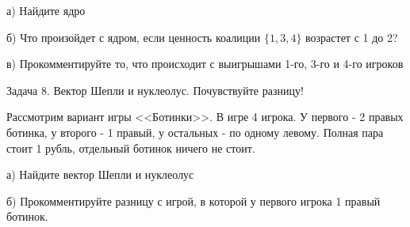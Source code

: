 а) Найдите ядро

б) Что произойдет с ядром, если ценность коалиции $\{1,3,4\}$ возрастет с 1 до 2?

в) Прокомментируйте то, что происходит с выигрышами 1-го, 3-го и 4-го игроков


Задача 8. Вектор Шепли и нуклеолус. Почувствуйте разницу!

Рассмотрим вариант игры <<Ботинки>>. В игре 4 игрока. У первого - 2 правых ботинка, у второго - 1 правый, у остальных - по одному левому. Полная пара стоит 1 рубль, отдельный ботинок ничего не стоит.

а) Найдите вектор Шепли и нуклеолус

б) Прокомментируйте разницу с игрой, в которой у первого игрока 1 правый ботинок.





